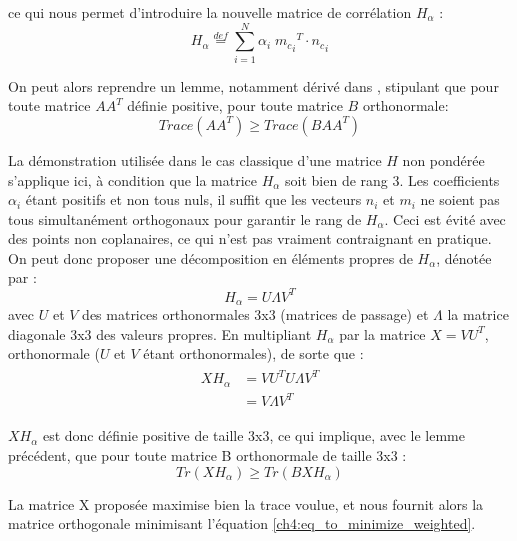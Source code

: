 ce qui nous permet d'introduire la nouvelle matrice de corrélation $H_\alpha$ :
\begin{equation}
	H_\alpha \stackrel{def}{=} \sum\limits_{i=1}^{N} { \alpha_i \; {m_c}_i}^T \cdot {n_c}_i
\end{equation}

On peut alors reprendre un lemme, notamment dérivé dans \cite{Arun1987}, stipulant que pour toute matrice $AA^T$ définie positive, pour toute matrice $B$ orthonormale:
\begin{equation}
	Trace(AA^T) \geq Trace(BAA^T)
\end{equation}

La démonstration utilisée dans le cas classique d'une matrice $H$ non pondérée s'applique ici, à condition que la matrice $H_\alpha$ soit bien de rang 3. Les coefficients $\alpha_i$ étant positifs et non tous nuls, il suffit que les vecteurs $n_i$ et $m_i$ ne soient pas tous simultanément orthogonaux pour garantir le rang de $H_\alpha$. Ceci est évité avec des points non coplanaires, ce qui n'est pas vraiment contraignant en pratique. On peut donc proposer une décomposition en éléments propres de $H_\alpha$, dénotée par :
\begin{equation}
	H_\alpha = U \Lambda V^T
\end{equation}
avec $U$ et $V$ des matrices orthonormales 3x3 (matrices de passage) et $\Lambda$ la matrice diagonale 3x3 des valeurs propres. En multipliant $H_\alpha$ par la matrice $X = VU^T$, orthonormale ($U$ et $V$ étant orthonormales), de sorte que :
\begin{align}
	\begin{split}
		X H_\alpha	&= V U^T U \Lambda V^T \\
			&= V \Lambda V^T
	\end{split}
\end{align}

$XH_\alpha$ est donc définie positive de taille 3x3, ce qui implique, avec le lemme précédent, que pour toute matrice B orthonormale de taille 3x3 :
\begin{equation}
	Tr(X H_\alpha) \geq Tr(B X H_\alpha)
\end{equation}

La matrice X proposée maximise bien la trace voulue, et nous fournit alors la matrice orthogonale minimisant l'équation \ref{ch4:eq_to_minimize_weighted}.


